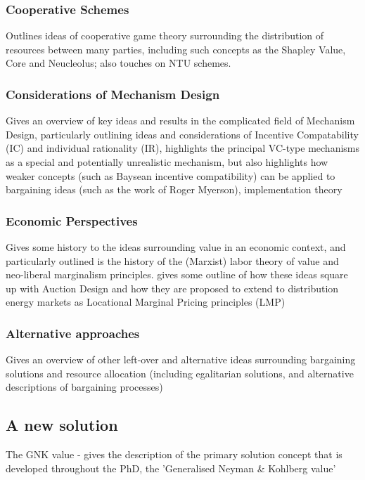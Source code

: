 \documentclass{article}
\begin{document}
\subsubsection{Cooperative Schemes}
Outlines ideas of cooperative game theory surrounding the
distribution of resources between many parties, including such concepts as the Shapley Value, Core and Neucleolus; also touches on NTU schemes.

\subsubsection{Considerations of Mechanism Design}
Gives an overview of key ideas and results in the complicated field of Mechanism Design, particularly outlining ideas and considerations of Incentive Compatability (IC) and individual rationality (IR), highlights the principal VC-type mechanisms as a special and potentially unrealistic mechanism, but also highlights how weaker concepts (such as Baysean incentive compatibility) can be applied to bargaining ideas (such as the work of Roger Myerson), implementation theory

\subsubsection{Economic Perspectives}
Gives some history to the ideas surrounding value in an economic context, and particularly outlined is the history of the (Marxist) labor theory of value and neo-liberal marginalism principles. gives some outline of how these ideas square up with Auction Design and how they are proposed to extend to distribution energy markets as Locational Marginal Pricing principles (LMP)

\subsubsection{Alternative approaches}
Gives an overview of other left-over and alternative ideas surrounding bargaining solutions and resource allocation (including egalitarian solutions, and alternative descriptions of bargaining processes)

\subsection{A new solution}
The GNK value - gives the description of the primary solution concept that is developed throughout the PhD, the 'Generalised Neyman \& Kohlberg value'
\end{document}
